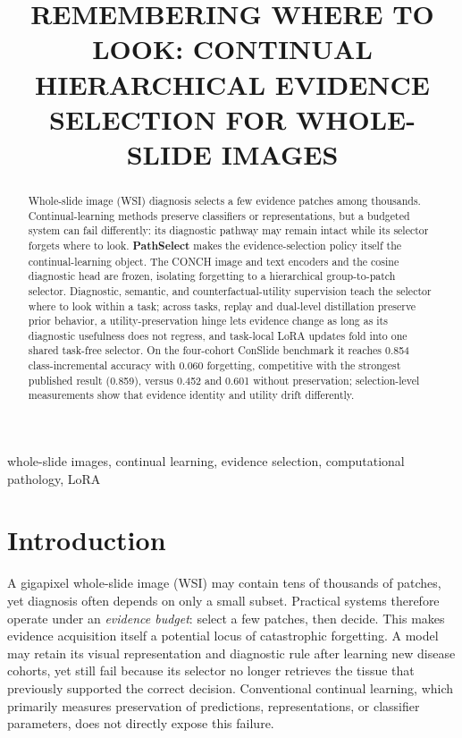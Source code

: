 \documentclass{article}
\title{REMEMBERING WHERE TO LOOK: CONTINUAL HIERARCHICAL EVIDENCE SELECTION FOR WHOLE-SLIDE IMAGES}
\begin{document}
\ninept
\maketitle

\begin{abstract}
Whole-slide image (WSI) diagnosis selects a few evidence patches among thousands. Continual-learning methods preserve classifiers or representations, but a budgeted system can fail differently: its diagnostic pathway may remain intact while its selector forgets where to look. \textbf{PathSelect} makes the evidence-selection policy itself the continual-learning object. The CONCH image and text encoders and the cosine diagnostic head are frozen, isolating forgetting to a hierarchical group-to-patch selector. Diagnostic, semantic, and counterfactual-utility supervision teach the selector where to look within a task; across tasks, replay and dual-level distillation preserve prior behavior, a utility-preservation hinge lets evidence change as long as its diagnostic usefulness does not regress, and task-local LoRA updates fold into one shared task-free selector. On the four-cohort ConSlide benchmark it reaches 0.854 class-incremental accuracy with 0.060 forgetting, competitive with the strongest published result (0.859), versus 0.452 and 0.601 without preservation; selection-level measurements show that evidence identity and utility drift differently.
\end{abstract}

\begin{keywords}
whole-slide images, continual learning, evidence selection, computational pathology, LoRA
\end{keywords}

\section{Introduction}
\label{sec:intro}

A gigapixel whole-slide image (WSI) may contain tens of thousands of patches, yet diagnosis often depends on only a small subset. Practical systems therefore operate under an \emph{evidence budget}: select a few patches, then decide. This makes evidence acquisition itself a potential locus of catastrophic forgetting. A model may retain its visual representation and diagnostic rule after learning new disease cohorts, yet still fail because its selector no longer retrieves the tissue that previously supported the correct decision. Conventional continual learning, which primarily measures preservation of predictions, representations, or classifier parameters, does not directly expose this failure.
\end{document}
